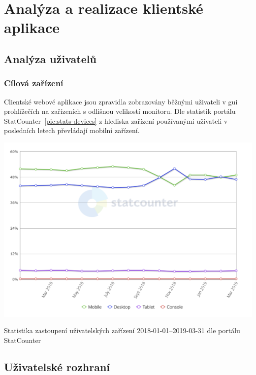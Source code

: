 \chapter{Analýza a realizace klientské aplikace}


\section{Analýza uživatelů}

\subsection{Cílová zařízení}

Clientské webové aplikace jsou zpravidla zobrazovány běžnými uživateli v \gls{gui} prohlížečích na zařízeních s odlišnou velikostí monitoru. Dle statistik portálu StatCounter~\ref{pic:stats-devices} z hlediska zařízení používanými uživateli v posledních letech převládají mobilní zařízení.


\begin{fig:illustration}
   \includegraphics[width=1\textwidth]{images/stats-devices.png}
   \caption[Statistika zastoupení uživatelských zařízení]{Statistika zastoupení uživatelských zařízení 2018-01-01--2019-03-31 dle portálu StatCounter~\cite{statCounterDevices}}\label{pic:stats-devices}
\end{fig:illustration}
	


\section{Uživatelské rozhraní}

